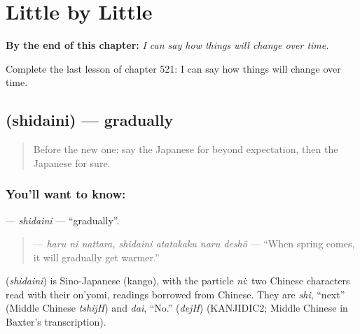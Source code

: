 
\chapter{Little by Little}
\label{ch:ja-little-by-little}

\begin{chapteropening}
\textbf{By the end of this chapter:} \emph{I can say how things will change over time.}

Complete the last lesson of chapter 521: I can say how things will change over time.
\end{chapteropening}

\section[\texorpdfstring{\ja{しだいに} (shidaini)}{しだいに (shidaini)}]{ (shidaini) — gradually}

\label{lesson:JA-C521-shidaini}



\begin{quote}
Before the new one: say the Japanese for beyond expectation, then the Japanese for sure.
\end{quote}

\subsection*{You'll want to know: }
\textbf{} — \emph{shidaini} — \textquotedblleft{}gradually\textquotedblright{}.

\begin{quote}
\textbf{   } — \emph{haru ni nattara, shidaini atatakaku naru deshō} — \textquotedblleft{}When spring comes, it will gradually get warmer.\textquotedblright{}
\end{quote}

\begin{cousinweb}
\textbf{} (\emph{shidaini}) is Sino-Japanese (kango), with the particle \emph{ni}: two Chinese characters read with their on'yomi, readings borrowed from Chinese. They are \emph{shi}, \textquotedblleft{}next\textquotedblright{} (Middle Chinese \emph{tshijH}) and \emph{dai}, \textquotedblleft{}No.\textquotedblright{} (\emph{dejH}) (KANJIDIC2; Middle Chinese in Baxter's transcription).
\end{cousinweb}

